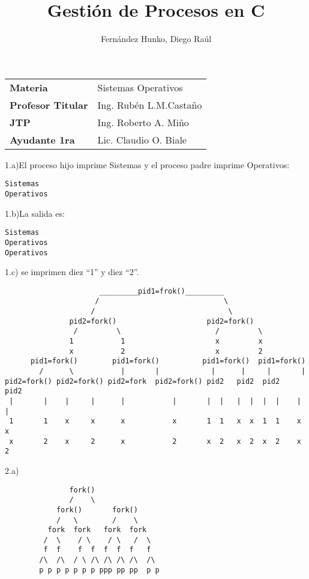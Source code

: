 \documentclass{article}
\title{\Huge{Gesti\'on de Procesos en C}}
\author{\Large{Fern\'andez Hunko, Diego Ra\'ul}}
\begin{document}
\maketitle

\begin{tabular}{l l}
\textbf{\large{Materia}} & \large{Sistemas Operativos} \\
\textbf{\large{Profesor Titular}} & \large{Ing. Rub\'en L.M.Casta\~no} \\      
\textbf{\large{JTP}} & \large{Ing. Roberto A. Mi\~no} \\
\textbf{\large{Ayudante 1ra}} & \large{Lic. Claudio O. Biale} \\
\end{tabular}
\newpage

1.a)El proceso hijo imprime Sistemas y el proceso padre imprime Operativos:
\begin{verbatim}
Sistemas
Operativos
\end{verbatim}

1.b)La salida es:
\begin{verbatim}
Sistemas
Operativos
Operativos
\end{verbatim}

1.c) se imprimen diez ``1'' y diez ``2''.

\begin{verbatim}
                      _________pid1=frok()_________
                     /                             \
                    /                               \
               pid2=fork()                     pid2=fork()
                /         \                      /         \
               1           1                     x         x
               x           2                     x         2
      pid1=fork()        pid1=fork()          pid1=fork()  pid1=fork()
        /      \           |       |            |      |     |       |
pid2=fork() pid2=fork() pid2=fork  pid2=fork() pid2   pid2  pid2    pid2
 |       |    |     |      |           |       |  |   |  |  |  |    |  |
 1       1    x     x      x           x       1  1   x  x  1  1    x  x
 x       2    x     2      x           2       x  2   x  2  x  2    x  2
\end{verbatim}

2.a)
\begin{verbatim}
               fork()
               /    \
            fork()       fork()
            /   \        /    \
          fork  fork   fork  fork
         /  \    / \    / \   /  \
         f  f    f  f  f  f  f   f
        /\  /\  / \ /\ /\ /\ /\  /\
        p p p p p p p ppp pp pp  p p
\end{verbatim}
\end{document}
